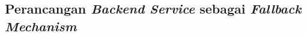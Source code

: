 \subsection{Perancangan \emph{Backend Service} sebagai \emph{Fallback Mechanism}}
\label{subsec:perancangan-fallback-mechanism}